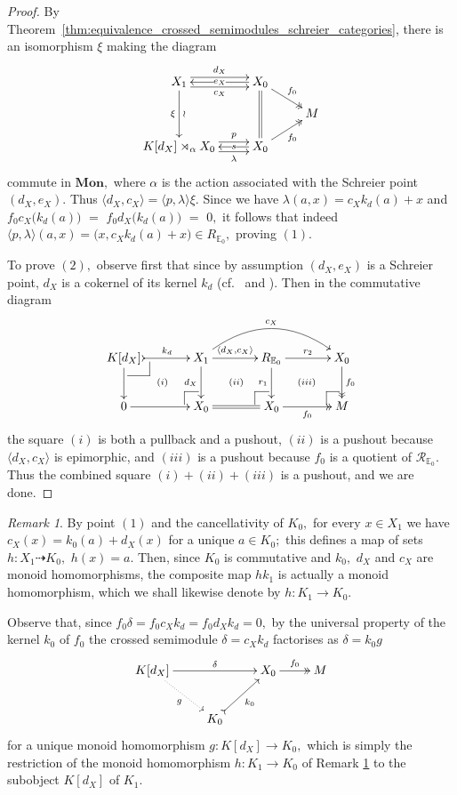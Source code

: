 \documentclass[a4paper]{amsart}
\makeatletter
\theoremstyle{plain}
\theoremstyle{definition}
\theoremstyle{remark}
\newtheorem{remark}[subsection]{Remark}
\newcommand{\pullback}[4]{{#1 \leftindex_{#2}{\times}_{#3} #4}}
\newcommand{\la}{\langle}
\newcommand{\ra}{\rangle}
\def\pullback{%
 \ar@{-}[]+R+<4pt,-3pt>;[]+RD+<4pt,-6pt>%
 \ar@{-}[]+D+<3pt,-6pt>;[]+RD+<4pt,-6pt>}
\def\pushout{%
  \ar@{-}[]+U+<-2pt,5pt>;[]+LU+<-4pt,5pt>%
  \ar@{-}[]+L+<-4pt,2pt>;[]+LU+<-4pt,5pt>}%
\makeatother
\begin{document}
\begin{proof}
By Theorem~\ref{thm:equivalence_crossed_semimodules_schreier_categories}, there is an isomorphism $\xi$ making the diagram
\begin{equation*}
\xymatrixrowsep{1pc}
\xymatrix{
{X_1} \ar[dd]_-{\xi}^-{\wr} \ar@<.9ex>[r]^-{d_X} \ar@<-.9ex>[r]_-{c_X} &{X_0} \ar@{=}[dd] \ar@{->>}[rd]^-{f_0} \ar[l]|-{e_X} \\
&\ &M \\
{K[d_X]\rtimes_{\alpha}X_0} \ar@<.9ex>[r]^-{p} \ar@<-.9ex>[r]_-{\lambda} &{X_0} \ar[l]|-{s} \ar@{->>}[ru]_-{f_0}
}
\end{equation*}
commute in $\mathbf{Mon},$ where $\alpha$ is the action associated with the Schreier point $(d_X,e_X).$ Thus  $\la d_X,c_X\ra=\la p,\lambda\ra\xi.$ Since we have $\lambda(a,x)=c_Xk_d(a)+x$ and $f_0c_X\big(k_d(a)\big)$ $=$ $f_0d_X\big(k_d(a)\big)$ $=$ $0,$ it follows that indeed $\la p,\lambda \ra(a,x)=\big(x,c_Xk_d(a)+x\big)\in R_{\mathbb{E}_0},$ proving $(1).$

To prove $(2),$ observe first that since by assumption $(d_X,e_X)$ is a Schreier point, $d_X$ is a cokernel of its kernel $k_d$ (cf.~\cite[Section 4]{P-II} and \cite[Proposition 2.6]{AMR}). Then in the commutative diagram
\begin{equation*}
\xymatrixcolsep{3pc}
\xymatrix{
{K[d_X]} \pullback\ar[d] \ar@{>->}[r]^-{k_d} \ar@{}[rd]|{(i)} &{X_1} \ar@/^2pc/[rr]^-{c_X} \ar[r]^-{\la d_X,c_X\ra} \ar[d]_-{d_X} \ar@{}[rd]|{(ii)} &{R_{\mathbb{E}_0}} \ar[d]_-{r_1} \ar[r]^-{r_2} \ar@{}[rd]|{(iii)} &{X_0} \ar@{->>}[d]^-{f_0} \\
0 \ar[r] &{X_0} \pushout \ar@{=}[r] &{X_0} \pushout \ar@{->>}[r]_-{f_0} &{M} \pushout
}
\end{equation*}
the square $(i)$ is both a pullback and a pushout, $(ii)$ is a pushout because $\la d_X,c_X\ra$ is epimorphic, and $(iii)$ is a pushout because $f_0$ is a quotient of $\mathcal{R}_{\mathbb{E}_0}.$ Thus the combined square $(i)+(ii)+(iii)$ is a pushout, and we are done.
\end{proof}
\begin{remark}
\label{rmk:h}
By point $(1)$ and the cancellativity of $K_0,$ for every $x\in X_1$ we have $c_X(x)=k_0(a)+d_X(x)$ for a unique $a\in K_0;$ this defines a map of sets $h\colon X_1\dashrightarrow K_0,$ $h(x)=a.$ Then, since $K_0$ is commutative and $k_0,$ $d_X$ and $c_X$ are monoid homomorphisms, the composite map $hk_1$ is actually a monoid homomorphism, which we shall likewise denote by $h\colon K_1\rightarrow K_0.$
\end{remark}
Observe that, since $f_0\delta=f_0c_Xk_d=f_0d_Xk_d=0,$ by the universal property of the kernel $k_0$ of $f_0$ the crossed semimodule $\delta=c_Xk_d$ factorises as $\delta=k_0g$
\begin{equation*}
\xymatrix{
{K[d_X]} \ar[rr]^-{\delta} \ar@{.>}[rd]_-g &\ &{X_0} \ar@{->>}[r]^-{f_0} &{M} \\
&{K_0} \ar@{>->}[ru]_-{k_0} &\ &\
}
\end{equation*}
for a unique monoid homomorphism $g\colon K[d_X]\rightarrow K_0,$ which is simply the restriction of the monoid homomorphism $h\colon K_1\rightarrow K_0$ of Remark \ref{rmk:h} to the subobject $K[d_X]$ of $K_1.$
\end{document}
